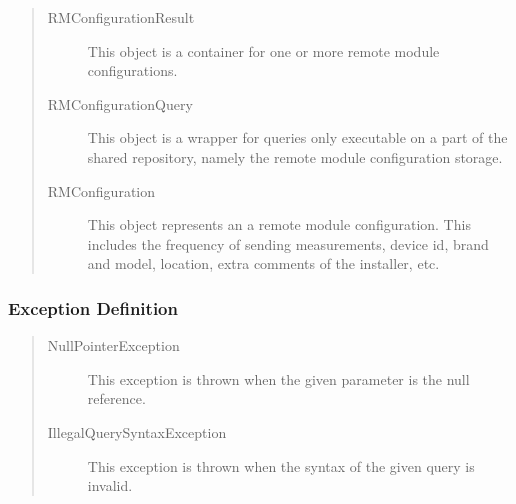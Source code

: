 \begin{quote}
	\begin{description}
		\item[RMConfigurationResult] This object is a container for one or more remote module
		configurations.
		\item[RMConfigurationQuery] This object is a wrapper for queries only executable on a
		part of the shared repository, namely the remote module configuration storage.
		\item[RMConfiguration] This object represents an a remote module
		configuration. This includes the frequency of sending measurements, device id,
		brand and model, location, extra comments of the installer, etc.
	\end{description} 
\end{quote}

\subsubsection{Exception Definition} 

\begin{quote}
	\begin{description}
		\item[NullPointerException] This exception is thrown when the given parameter
		is the null reference.
		\item[IllegalQuerySyntaxException] This exception is thrown when the syntax of
		the given query is invalid.
	\end{description} 
\end{quote}